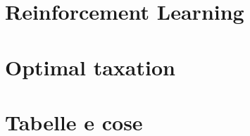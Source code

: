 \documentclass[12pt,a4paper,openright,twoside]{report}
\numberwithin{equation}{section}
\renewcommand{\chaptermark}[1]{\markboth{\thechapter.\ #1}{}}
\begin{document}
\chapter{Reinforcement Learning}





\chapter{Optimal taxation}






\renewcommand{\chaptermark}[1]{\markright{\thechapter \ #1}{}}
\lhead[\fancyplain{}{\bfseries\thepage}]{\fancyplain{}{\bfseries\rightmark}}
\appendix   
\chapter{Tabelle e cose}  



\printbibliography
\end{document}
